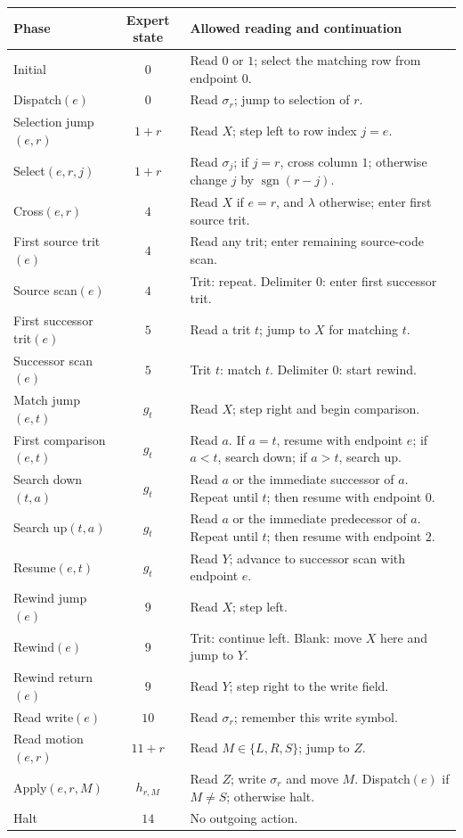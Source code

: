 \documentclass[11pt,a4paper]{article}
\newcommand{\blank}{\lambda}
\begin{document}
\begin{center}
\footnotesize\renewcommand{\arraystretch}{1.13}
\begin{tabularx}{\textwidth}{l c X}
\toprule\rowcolor{Pale}Phase & Expert state & Allowed reading and continuation\\\midrule
Initial & $0$ & Read $0$ or $1$; select the matching row from endpoint $0$.\\
Dispatch$(e)$ & $0$ & Read $\sigma_r$; jump to selection of $r$.\\
Selection jump$(e,r)$ & $1+r$ & Read $X$; step left to row index $j=e$.\\
Select$(e,r,j)$ & $1+r$ & Read $\sigma_j$; if $j=r$, cross column $1$; otherwise change $j$ by $\operatorname{sgn}(r-j)$.\\
Cross$(e,r)$ & $4$ & Read $X$ if $e=r$, and $\blank$ otherwise; enter first source trit.\\
First source trit$(e)$ & $4$ & Read any trit; enter remaining source-code scan.\\
Source scan$(e)$ & $4$ & Trit: repeat. Delimiter $0$: enter first successor trit.\\
First successor trit$(e)$ & $5$ & Read a trit $t$; jump to $X$ for matching $t$.\\
Successor scan$(e)$ & $5$ & Trit $t$: match $t$. Delimiter $0$: start rewind.\\
Match jump$(e,t)$ & $g_t$ & Read $X$; step right and begin comparison.\\
First comparison$(e,t)$ & $g_t$ & Read $a$. If $a=t$, resume with endpoint $e$; if $a<t$, search down; if $a>t$, search up.\\
Search down$(t,a)$ & $g_t$ & Read $a$ or the immediate successor of $a$. Repeat until $t$; then resume with endpoint $0$.\\
Search up$(t,a)$ & $g_t$ & Read $a$ or the immediate predecessor of $a$. Repeat until $t$; then resume with endpoint $2$.\\
Resume$(e,t)$ & $g_t$ & Read $Y$; advance to successor scan with endpoint $e$.\\
Rewind jump$(e)$ & $9$ & Read $X$; step left.\\
Rewind$(e)$ & $9$ & Trit: continue left. Blank: move $X$ here and jump to $Y$.\\
Rewind return$(e)$ & $9$ & Read $Y$; step right to the write field.\\
Read write$(e)$ & $10$ & Read $\sigma_r$; remember this write symbol.\\
Read motion$(e,r)$ & $11+r$ & Read $M\in\{L,R,S\}$; jump to $Z$.\\
Apply$(e,r,M)$ & $h_{r,M}$ & Read $Z$; write $\sigma_r$ and move $M$. Dispatch$(e)$ if $M\ne S$; otherwise halt.\\
Halt & $14$ & No outgoing action.\\
\bottomrule
\end{tabularx}
\end{center}
\end{document}
